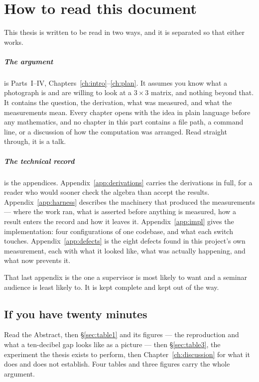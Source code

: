 \chapter*{How to read this document}

This thesis is written to be read in two ways, and it is separated so that either
works.

\paragraph{The argument} is Parts~I--IV, Chapters~\ref{ch:intro}--\ref{ch:plan}.
It assumes you know what a photograph is and are willing to look at a
$3\times3$ matrix, and nothing beyond that. It contains the question, the
derivation, what was measured, and what the measurements mean. Every chapter
opens with the idea in plain language before any mathematics, and no chapter in
this part contains a file path, a command line, or a discussion of how the
computation was arranged. Read straight through, it is a talk.

\paragraph{The technical record} is the appendices. Appendix~\ref{app:derivations}
carries the derivations in full, for a reader who would sooner check the algebra
than accept the results. Appendix~\ref{app:harness} describes the machinery
that produced the measurements --- where the work ran, what is asserted before
anything is measured, how a result enters the record and how it leaves it.
Appendix~\ref{app:impl} gives the implementation: four configurations of one codebase, and what each switch touches. Appendix~\ref{app:defects} is the
eight defects found in this project's own measurement, each with what it looked
like, what was actually happening, and what now prevents it.

\medskip
\noindent
That last appendix is the one a supervisor is most likely to want and a seminar
audience is least likely to. It is kept complete and kept out of the way.

\section*{If you have twenty minutes}

Read the Abstract, then \S\ref{sec:table1} and its figures --- the reproduction
and what a ten-decibel gap looks like as a picture --- then \S\ref{sec:table3},
the experiment the thesis exists to perform, then Chapter~\ref{ch:discussion} for
what it does and does not establish. Four tables and three figures carry the
whole argument.

